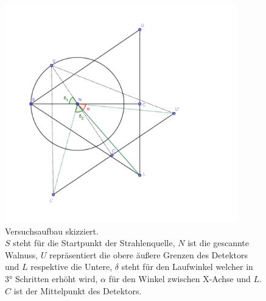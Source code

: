 \begin{figure}[htb]
	\centering
	\includegraphics[width=0.9\textwidth]{k4.2/versuchsaufbau-skizze.png}
	\caption{Versuchsaufbau skizziert. \\
	$S$ steht für die Startpunkt der Strahlenquelle, $N$ ist die gescannte Walnuss, $U$ repräsentiert die obere äußere Grenzen des Detektors und $L$ respektive die Untere, $\delta$ steht für den Laufwinkel welcher in 3° Schritten erhöht wird, $\alpha$ für den Winkel zwischen X-Achse und $L$. $C$ ist der Mittelpunkt des Detektors.
	}
	\label{k4.2.fig.skizze}
\end{figure}

